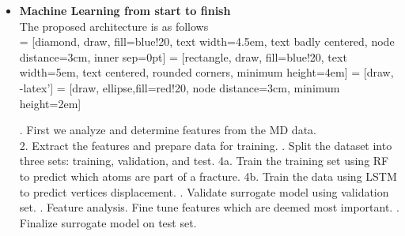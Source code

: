 \begin{itemize}
\begin{itemize}
\bigskip
\bigskip
\\

\item \textbf{Machine Learning from start to finish}
\bigskip
\\
The proposed architecture is as follows
\bigskip
\\
 = [diamond, draw, fill=blue!20, 
    text width=4.5em, text badly centered, node distance=3cm, inner sep=0pt]
 = [rectangle, draw, fill=blue!20, 
    text width=5em, text centered, rounded corners, minimum height=4em]
 = [draw, -latex']
 = [draw, ellipse,fill=red!20, node distance=3cm,
    minimum height=2em]
    

. First we analyze and determine features from the MD data.
    \\
    2. Extract the features and prepare data for training. 
    . Split the dataset into three sets: training, validation, and test.
    \newline
    4a. Train the training set using RF to predict which atoms are part of a fracture.
    \newline
    4b. Train the data using LSTM to predict vertices displacement.
    . Validate surrogate model using validation set. 
    . Feature analysis. Fine tune features which are deemed most important. 
    . Finalize surrogate model on test set. 




\end{itemize}


\end{itemize}